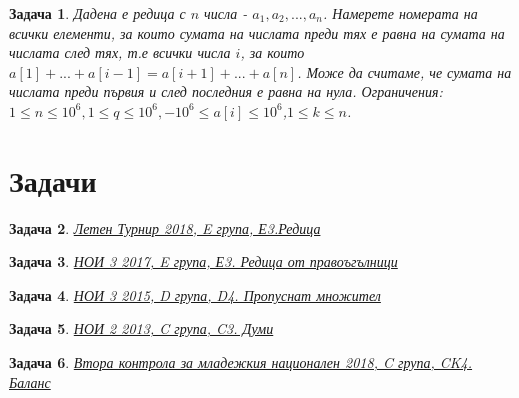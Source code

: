\documentclass[]{article}
\newtheorem{problem}{Задача}
\begin{document}
\begin{problem}
Дадена е редица с $n$ числа - $a_1,a_2,...,a_n$. Намерете номерата на всички елементи, за които сумата на числата преди тях е равна на сумата на числата след тях, т.е всички числа $i$, за които $a[1]+...+a[i-1]=a[i+1]+...+a[n]$. Може да считаме, че сумата на числата преди първия и след последния е равна на нула.\newline
Ограничения: $1\leq n\leq 10^6,1\leq q\leq 10^6,-10^6 \leq a[i]\leq 10^6$,$1\leq k\leq n$.
\end{problem}	

\section{Задачи}

\begin{problem}
\href{https://arena.olimpiici.com/#/catalog/87/problem/198}{Летен Турнир 2018, E група, Е3.Редица}
\end{problem}

\begin{problem}
\href{https://arena.olimpiici.com/#/catalog/251/problem/709}{НОИ 3 2017, E група, Е3. Редица от правоъгълници}
\end{problem}

\begin{problem}
\href{https://arena.olimpiici.com/#/catalog/241/problem/662}{НОИ 3 2015, D група, D4. Пропуснат множител}
\end{problem}

\begin{problem}
\href{https://arena.olimpiici.com/#/catalog/175/problem/417}{НОИ 2 2013, C група, C3. Думи}
\end{problem}

\begin{problem}
\href{https://arena.olimpiici.com/api/public/problems/1142/pdf}{Втора контрола за младежкия национален 2018, C група, CK4. Баланс}
\end{problem}
\end{document}
